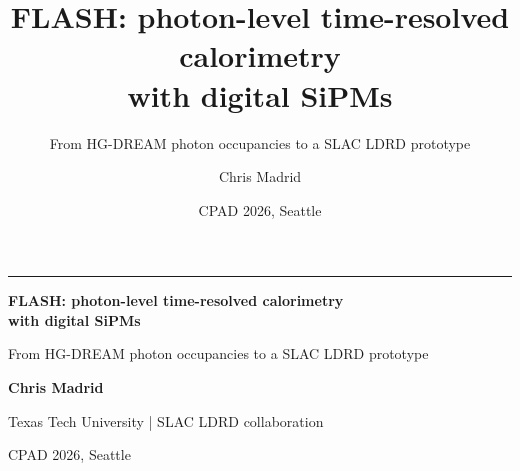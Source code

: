\documentclass[10pt,aspectratio=169,t]{beamer}
\title{FLASH: photon-level time-resolved calorimetry\\with digital SiPMs}
\subtitle{From HG-DREAM photon occupancies to a SLAC LDRD prototype}
\author{Chris Madrid}
\institute{Texas Tech University \hspace{0.4em}|\hspace{0.4em} SLAC LDRD collaboration}
\date{CPAD 2026, Seattle}
\begin{document}
\begin{frame}[plain]
  \vspace{0.55cm}
  {\color{TTURed}\rule{\textwidth}{2.4pt}}
  \vspace{0.55cm}

  {\fontsize{27}{31}\selectfont\bfseries\color{Ink}
    FLASH: photon-level time-resolved calorimetry\\[0.12cm]
    with digital SiPMs\par}
  \vspace{0.35cm}
  {\fontsize{17}{20}\selectfont\color{Slate}
    From HG-DREAM photon occupancies to a SLAC LDRD prototype\par}

  \vfill
  {\fontsize{15}{18}\selectfont\bfseries Chris Madrid\par}
  {\fontsize{12}{15}\selectfont Texas Tech University | SLAC LDRD collaboration\par}
  \vspace{0.18cm}
  {\fontsize{12}{15}\selectfont CPAD 2026, Seattle\par}
  \vspace{0.10cm}
\end{frame}
\end{document}
